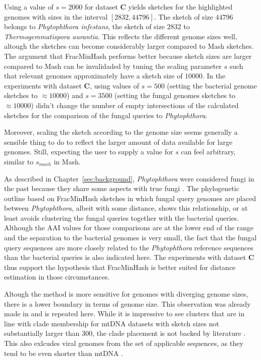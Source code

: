 Using a value of $s=2000$ for dataset \textbf{C} yields sketches for the
highlighted genomes with sizes in the interval $[2832, 44796]$. The sketch of
size $44796$ belongs to \textit{Phytophthora infestans}, the sketch of size
$2832$ to \textit{Thermogemmatispora aurantia}. This reflects the different
genome sizes well, altough the sketches can become considerably larger compared
to Mash sketches. The argument that FracMinHash performs better because sketch
sizes are larger compared to Mash can be invalidaded by tuning the scaling
parameter $s$ such that relevant genomes approximately have a sketch size of
$10000$. In the experiments with dataset \textbf{C}, using values of $s=500$
(setting the bacterial genome sketches to $\approx 10000$) and $s=3500$ (setting
the fungal genomes sketches to $\approx 10000$) didn't change the number of
empty intersections of the calculated sketches for the comparison of the fungal
queries to \textit{Phytophthora}. 

Moreover, scaling the sketch according to the genome size seems generally a
sensible thing to do to reflect the larger amount of data available for large
genomes. Still, expecting the user to supply a value for $s$ can feel arbitrary,
similar to $s_{mash}$ in Mash.

As described in Chapter~\ref{sec:background}, \textit{Phytophthora} were
considered fungi in the past because they share some aspects with true fungi
\cite{debaryResearchesNaturePotatofungus1876,rossmanWhyArePhytophthora2012}. The
phylogenetic outline based on FracMinHash sketches in which fungal query genomes
are placed between \textit{Phytophthora}, albeit with some distance, shows this
relationship, or at least avoids clustering the fungal queries together with the
bacterial queries. Although the AAI values for those comparisons are at the
lower end of the range and the separation to the bacterial genomes is very
small, the fact that the fungal query sequences are more closely related to the
\textit{Phytophthora} reference sequences than the bacterial queries is also
indicated here. The experiments with dataset \textbf{C} thus support the
hypothesis that FracMinHash is better suited for distance estimation in those
circumstances.

Altough the method is more sensitive for genomes with diverging genome sizes,
there is a lower boundary in terms of genome size. This observation was already
made in
\cite{irberLightweightCompositionalAnalysis2022,heraDerivingConfidenceIntervals2023}
and is repeated here. While it is impressive to see clusters that are in line
with clade membership for mtDNA datasets with sketch sizes not substantially
larger than $300$, the clade placement is not backed by literature
\cite{winkworthComparativeAnalysesComplete2022,abadPhytophthoraTaxonomicPhylogenetic2023a,
yangExpandedPhylogenyGenus2017}. This also exlcudes viral genomes from the set
of applicable sequences, as they tend to be even shorter than mtDNA
\cite{dimmockIntroductionModernVirology2001}.

